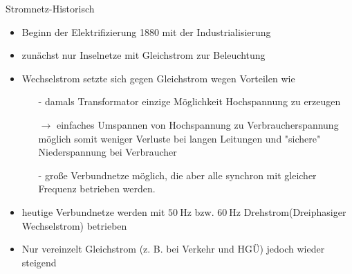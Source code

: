 \documentclass[aspectratio=1610, professionalfonts, 9pt]{beamer}
\begin{document}
\begin{frame}{Stromnetz-Historisch}
\begin{itemize}
  \item Beginn der Elektrifizierung 1880 mit der Industrialisierung
  \item zunächst nur Inselnetze mit Gleichstrom zur Beleuchtung
  \item Wechselstrom setzte sich gegen Gleichstrom wegen Vorteilen wie
  \begin{itemize}
    \item[-] damals Transformator einzige Möglichkeit Hochspannung zu erzeugen
    \item[$\rightarrow$] einfaches Umspannen von Hochspannung zu Verbraucherspannung möglich
    somit weniger Verluste bei langen Leitungen und "sichere" Niederspannung bei Verbraucher
    \item[-] große Verbundnetze möglich, die aber alle synchron mit gleicher Frequenz betrieben werden.
  \end{itemize}
  \item heutige Verbundnetze werden mit $\SI{50}{\hertz}$ bzw. $\SI{60}{\hertz}$ Drehstrom(Dreiphasiger Wechselstrom) betrieben
  \item Nur vereinzelt Gleichstrom (z. B. bei Verkehr und HGÜ) jedoch wieder steigend
\end{itemize}
\end{frame}
%
\end{document}
